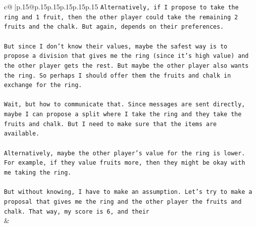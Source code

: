 \documentclass{article}
\begin{document}
{\begin{supertabular}{c@{$\;$}|p{.15\linewidth}@{}p{.15\linewidth}p{.15\linewidth}p{.15\linewidth}p{.15\linewidth}p{.15\linewidth}}
{{{\texttt{Alternatively, if I propose to take the ring and 1 fruit, then the other player could take the remaining 2 fruits and the chalk. But again, depends on their preferences. } \\
\\ 
\texttt{But since I don't know their values, maybe the safest way is to propose a division that gives me the ring (since it's high value) and the other player gets the rest. But maybe the other player also wants the ring. So perhaps I should offer them the fruits and chalk in exchange for the ring. } \\
\\ 
\texttt{Wait, but how to communicate that. Since messages are sent directly, maybe I can propose a split where I take the ring and they take the fruits and chalk. But I need to make sure that the items are available. } \\
\\ 
\texttt{Alternatively, maybe the other player's value for the ring is lower. For example, if they value fruits more, then they might be okay with me taking the ring. } \\
\\ 
\texttt{But without knowing, I have to make an assumption. Let's try to make a proposal that gives me the ring and the other player the fruits and chalk. That way, my score is 6, and their} \\
            }
        }
    }
    & \\ \\


\end{supertabular}}
\end{document}

